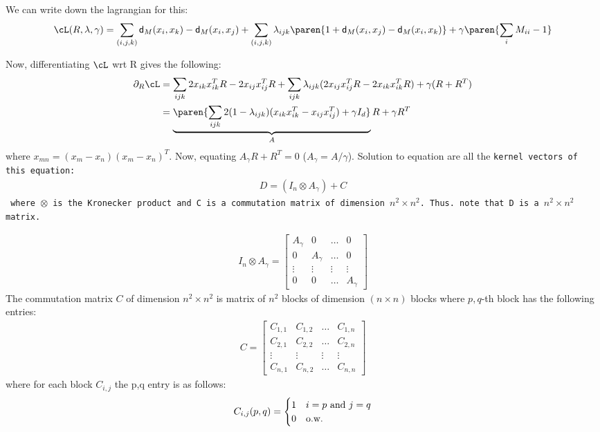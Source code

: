We can write down the lagrangian for this:
\begin{align*}
    \cL(R, \lambda, \gamma) = \sum_{(i,j,k)} \mathsf{d}_M(x_i,x_k) - \mathsf{d}_M(x_i,x_j) + \sum_{(i,j,k)} \lambda_{ijk} \paren{1 +  \mathsf{d}_M(x_i,x_j) - \mathsf{d}_M(x_i,x_k)} + \gamma \paren{ \sum_i M_{ii} - 1}
\end{align*}

Now, differentiating $\cL$ wrt R gives the following:
\begin{align*}
    \partial_R \cL &= \sum_{ijk} 2x_{ik}x_{ik}^TR - 2x_{ij}x_{ij}^TR + \sum_{ijk} \lambda_{ijk}(2x_{ij}x_{ij}^TR - 2x_{ik}x_{ik}^TR) + \gamma( R + R^T)\\
    &= \underbrace{\paren{\sum_{ijk} 2(1 - \lambda_{ijk})(x_{ik}x_{ik}^T - x_{ij}x_{ij}^T) + \gamma I_d}}_{A}R + \gamma R^T
\end{align*}
where $x_{mn} = (x_m - x_n)(x_m - x_n)^T$.
Now, equating $A_\gamma R + R^T = 0$ ($A_{\gamma} = A/\gamma$). Solution to equation are all the \tt{kernel} vectors of this equation:
\begin{align*}
    D = (I_n \otimes A_\gamma) + C
\end{align*}
where $\otimes$ is the Kronecker product and C is a commutation matrix of dimension $n^2 \times n^2$. Thus. note that D is a $n^2 \times n^2$ matrix.

\begin{align*}
    I_n \otimes A_\gamma = \begin{bmatrix}
  A_\gamma & 0& \ldots & 0 \\
  0 & A_\gamma& \ldots &0 \\
  \vdots & \vdots & \vdots & \vdots\\
  0& 0 & \ldots & A_\gamma
\end{bmatrix}
\end{align*}
The commutation matrix $C$ of dimension $n^2 \times n^2$ is matrix of $n^2$ blocks of dimension $(n \times n)$ blocks where $p,q$-th block has the following entries:
\begin{align*}
    C = \begin{bmatrix}
  C_{1,1} & C_{1,2}& \ldots & C_{1,n} \\
  C_{2,1} & C_{2,2}& \ldots & C_{2,n}\\
  \vdots & \vdots & \vdots & \vdots\\
  C_{n,1}& C_{n,2}& \ldots & C_{n,n}
\end{bmatrix}
\end{align*}
where for each block $C_{i,j}$ the p,q entry is as follows:
\begin{align*}
    C_{i,j}(p,q) = \begin{cases}
        1 &  i = p \textnormal{ and } j = q\\
        0 & \textnormal{o.w.}
    \end{cases}
\end{align*}
